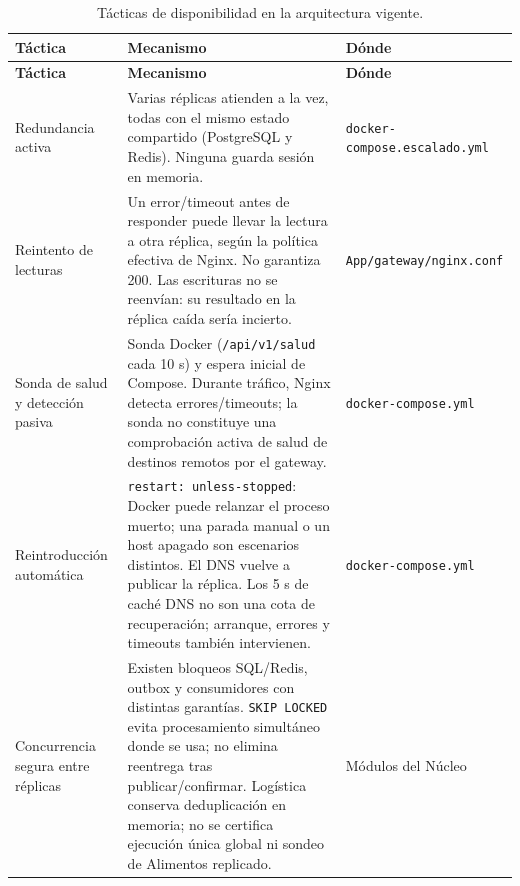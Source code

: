 \begin{center}
\begin{longtable}{|>{\raggedright\arraybackslash}p{2.8cm}|>{\raggedright\arraybackslash}p{6.7cm}|>{\raggedright\arraybackslash}p{3.8cm}|}
\caption{Tácticas de disponibilidad en la arquitectura vigente.}\label{tab:disponibilidad-vigente}\\
\hline
\textbf{Táctica} & \textbf{Mecanismo} & \textbf{Dónde}\\
\hline
\endfirsthead
\hline
\textbf{Táctica} & \textbf{Mecanismo} & \textbf{Dónde}\\
\hline
\endhead
Redundancia activa &
Varias réplicas atienden a la vez, todas con el mismo estado compartido (PostgreSQL y Redis). Ninguna
guarda sesión en memoria. &
\texttt{docker-compose.\allowbreak escalado.yml}\\
\hline
Reintento de lecturas &
Un error/timeout antes de responder puede llevar la lectura a otra réplica,
según la política efectiva de Nginx. No garantiza 200. Las escrituras no se
reenvían: su resultado en la réplica caída sería incierto. &
\texttt{App/gateway/\allowbreak nginx.conf}\\
\hline
Sonda de salud y detección pasiva &
Sonda Docker (\texttt{/api/v1/salud} cada 10 s) y espera inicial de Compose.
Durante tráfico, Nginx detecta errores/timeouts; la sonda no constituye una
comprobación activa de salud de destinos remotos por el gateway. &
\texttt{docker-compose.yml}\\
\hline
Reintroducción automática &
\texttt{restart: unless-stopped}: Docker puede relanzar el proceso muerto;
una parada manual o un host apagado son escenarios distintos. El DNS vuelve a
publicar la réplica. Los 5 s de caché DNS no son una cota de recuperación;
arranque, errores y timeouts también intervienen. &
\texttt{docker-compose.yml}\\
\hline
Concurrencia segura entre réplicas &
Existen bloqueos SQL/Redis, outbox y consumidores con distintas garantías.
\texttt{SKIP LOCKED} evita procesamiento simultáneo donde se usa; no elimina
reentrega tras publicar/confirmar. Logística conserva deduplicación en memoria;
no se certifica ejecución única global ni sondeo de Alimentos replicado. &
Módulos del Núcleo\\
\hline
\end{longtable}
\end{center}


